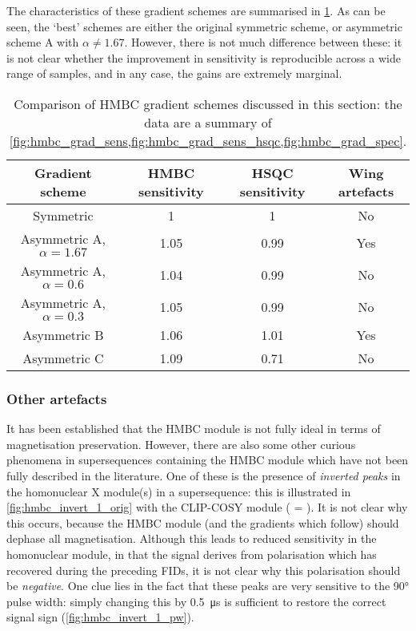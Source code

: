 The characteristics of these gradient schemes are summarised in \cref{tbl:hmbc_grads}.
As can be seen, the `best' schemes are either the original symmetric scheme, or asymmetric scheme A with $\alpha \neq 1.67$.
However, there is not much difference between these: it is not clear whether the improvement in sensitivity is reproducible across a wide range of samples, and in any case, the gains are extremely marginal.

\begin{table}[htb]
    \begin{tabular}{cccc}
        \toprule
        \textbf{Gradient scheme} & \textbf{HMBC sensitivity} & \textbf{HSQC sensitivity} & \textbf{Wing artefacts} \\
        \midrule
        Symmetric                     & 1    & 1    & No  \\
        Asymmetric A, $\alpha = 1.67$ & 1.05 & 0.99 & Yes \\
        Asymmetric A, $\alpha = 0.6$  & 1.04 & 0.99 & No  \\
        Asymmetric A, $\alpha = 0.3$  & 1.05 & 0.99 & No  \\
        Asymmetric B                  & 1.06 & 1.01 & Yes \\
        Asymmetric C                  & 1.09 & 0.71 & No  \\
        \bottomrule
    \end{tabular}
    \caption[Comparison of HMBC gradient schemes]{
        Comparison of HMBC gradient schemes discussed in this section: the data are a summary of \cref{fig:hmbc_grad_sens,fig:hmbc_grad_sens_hsqc,fig:hmbc_grad_spec}.
    }
    \label{tbl:hmbc_grads}
\end{table}


\subsubsection{Other artefacts}

It has been established that the HMBC module is not fully ideal in terms of magnetisation preservation.
However, there are also some other curious phenomena in supersequences containing the HMBC module which have not been fully described in the literature.
One of these is the presence of \textit{inverted peaks} in the homonuclear X module(s) in a  supersequence: this is illustrated in \cref{fig:hmbc_invert_1_orig} with the CLIP-COSY module ( = ).
It is not clear why this occurs, because the HMBC module (and the gradients which follow) should dephase all  magnetisation.
Although this leads to reduced sensitivity in the homonuclear module, in that the signal derives from polarisation which has recovered during the preceding FIDs, it is not clear why this polarisation should be \textit{negative}.
One clue lies in the fact that these peaks are very sensitive to the \proton{} \ang{90} pulse width: simply changing this by \qty{0.5}{\us} is sufficient to restore the correct signal sign (\cref{fig:hmbc_invert_1_pw}).

